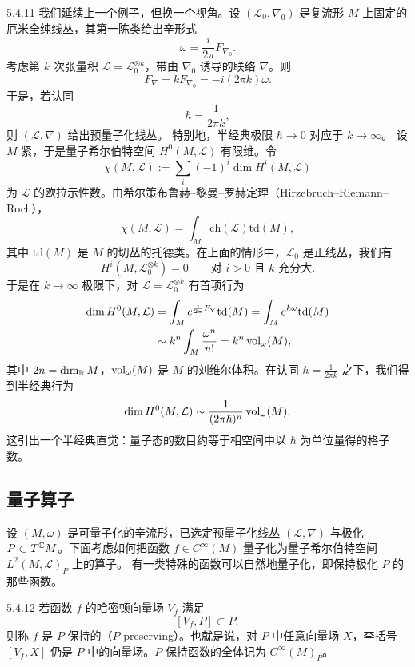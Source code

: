 \begin{example}{5.4.11}
  我们延续上一个例子，但换一个视角。设 $(\mathcal{L}_0,\nabla_0)$ 是复流形 $M$ 上固定的厄米全纯线丛，其第一陈类给出辛形式
  \[
  \omega=\frac{i}{2\pi}F_{\nabla_0}.
  \]
  考虑第 $k$ 次张量积 $\mathcal{L}=\mathcal{L}_0^{\otimes k}$，带由 $\nabla_0$ 诱导的联络 $\nabla$。则
  \[
  F_\nabla=kF_{\nabla_0}=-i(2\pi k)\omega.
  \]
  于是，若认同
  \[
  \hbar=\frac{1}{2\pi k},
  \]
  则 $(\mathcal{L},\nabla)$ 给出预量子化线丛。
  特别地，半经典极限 $\hbar\to0$ 对应于 $k\to\infty$。
  设 $M$ 紧，于是量子希尔伯特空间 $H^0(M,\mathcal{L})$ 有限维。令
  \[
  \chi(M,\mathcal{L}):=\sum_i(-1)^i\dim H^i(M,\mathcal{L})
  \]
  为 $\mathcal{L}$ 的欧拉示性数。由希尔策布鲁赫–黎曼–罗赫定理（Hirzebruch–Riemann–Roch），
  \[
  \chi(M,\mathcal{L})=\int_M\mathrm{ch}(\mathcal{L})\mathrm{td}(M),
  \]
  其中 $\mathrm{td}(M)$ 是 $M$ 的切丛的托德类。在上面的情形中，$\mathcal{L}_0$ 是正线丛，我们有
  \[
  H^i(M,\mathcal{L}_0^{\otimes k})=0
  \qquad\text{对 } i>0 \text{ 且 } k \text{ 充分大}.
  \]
  于是在 $k\to\infty$ 极限下，对 $\mathcal{L}=\mathcal{L}_0^{\otimes k}$ 有首项行为
  \[
  \begin{aligned}
  \dim H^0(M,\mathcal{L})
  &=\int_M e^{\frac{i}{2\pi}F_\nabla}\mathrm{td}(M)
  =\int_M e^{k\omega}\mathrm{td}(M)\\
  &\sim k^n\int_M\frac{\omega^n}{n!}=k^n\operatorname{vol}_\omega(M),
  \end{aligned}
  \]
  其中 $2n=\dim_{\mathbb{R}}M$，$\operatorname{vol}_\omega(M)$ 是 $M$ 的刘维尔体积。在认同
  $\hbar=\frac{1}{2\pi k}$ 之下，我们得到半经典行为
  \[
  \dim H^0(M,\mathcal{L})\sim\frac{1}{(2\pi\hbar)^n}\operatorname{vol}_\omega(M).
  \]
  这引出一个半经典直觉：量子态的数目约等于相空间中以 $\hbar$ 为单位量得的格子数。
\end{example}

\subsection{量子算子}

设 $(M,\omega)$ 是可量子化的辛流形，已选定预量子化线丛 $(\mathcal{L},\nabla)$ 与极化
$P\subset T^{\mathbb{C}} M$。下面考虑如何把函数 $f\in C^\infty(M)$ 量子化为量子希尔伯特空间
$L^2(M,\mathcal{L})_P$ 上的算子。
有一类特殊的函数可以自然地量子化，即保持极化 $P$ 的那些函数。

\begin{definition}{5.4.12}
  若函数 $f$ 的哈密顿向量场 $V_f$ 满足
  \[
  [V_f,P]\subset P,
  \]
  则称 $f$ 是 $P$-保持的（$P$-preserving）。也就是说，对 $P$ 中任意向量场 $X$，李括号
  $[V_f,X]$ 仍是 $P$ 中的向量场。$P$-保持函数的全体记为 $C^\infty(M)_P$。
\end{definition}

